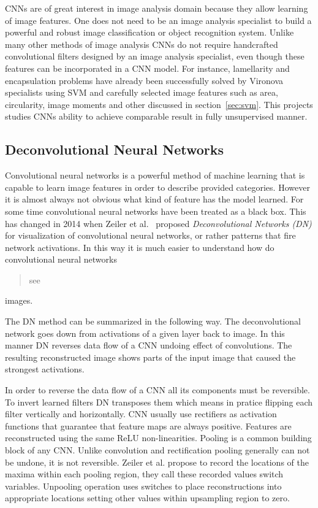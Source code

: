 \documentclass[a4paper, 11pt, table]{article}
\begin{document}
CNNs are of great interest in image analysis domain because they allow learning of image features. One does not need to be an image analysis specialist to build a powerful and robust image classification or object recognition system. Unlike many other methods of image analysis CNNs do not require handcrafted convolutional filters designed by an image analysis specialist, even though these features can be incorporated in a CNN model. For instance, lamellarity and encapsulation problems have already been successfully solved by Vironova specialists using SVM and carefully selected image features such as area, circularity, image moments and other discussed in section~\ref{sec:svm}. This projects studies CNNs ability to achieve comparable result in fully unsupervised manner. 


\subsection{Deconvolutional Neural Networks}
Convolutional neural networks is a powerful method of machine learning that is capable to learn image features in order to describe provided categories. However it is almost always not obvious what kind of feature has the model learned. For some time convolutional neural networks have been treated as a black box. This has changed in 2014 when Zeiler et al.~\cite{Zeiler2014} proposed \textit{Deconvolutional Networks (DN)} for visualization of convolutional  neural networks, or rather patterns that fire network activations. In this way it is much easier to understand how do convolutional neural networks \blockquote{see} images.

The DN method can be summarized in the following way. The deconvolutional network goes down from activations of a given layer back to image. In this manner DN reverses data flow of a CNN undoing effect of convolutions. The resulting reconstructed image shows parts of the input image that caused the strongest activations. 

In order to reverse the data flow of a CNN all its components must be reversible. To invert learned filters DN transposes them which means in pratice flipping each filter vertically and horizontally. CNN usually use rectifiers as activation functions that guarantee that feature maps are always positive. Features are reconstructed using the same ReLU non-linearities. Pooling is a common building block of any CNN. Unlike convolution and rectification pooling generally can not be undone, it is not reversible. Zeiler et al. propose to record the locations of the maxima within each pooling region, they call these recorded values switch variables. Unpooling operation uses switches to place reconstructions into appropriate locations setting other values within upsampling region to zero.
\end{document}
